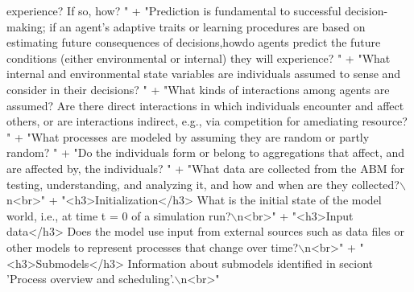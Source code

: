 \begin{DoxyCode}
{       experience? If so, how? "}
                                             +                            \textcolor{stringliteral}{"Prediction is fundamental to
       successful decision-making; if an agent's adaptive traits or learning procedures are based on estimating future
       consequences of decisions,howdo agents predict the future conditions (either environmental or internal)
       they will experience? "}
                                             +                            \textcolor{stringliteral}{"What internal and environmental
       state variables are individuals assumed to sense and consider in their decisions? "}
                                             +                            \textcolor{stringliteral}{"What kinds of interactions among
       agents are assumed? Are there direct interactions in which individuals encounter and affect others, or are
       interactions indirect, e.g., via competition for amediating resource? "}
                                             +                            \textcolor{stringliteral}{"What processes are modeled by
       assuming they are random or partly random? "}
                                             +                            \textcolor{stringliteral}{"Do the individuals form or
       belong to aggregations that affect, and are affected by, the individuals? "}
                                             +                            \textcolor{stringliteral}{"What data are collected from the
       ABM for testing, understanding, and analyzing it, and how and when are they collected?\(\backslash\)n<br>"}
                                             + \textcolor{stringliteral}{"<h3>Initialization</h3> What is the initial state of the
       model world, i.e., at time t = 0 of a simulation run?\(\backslash\)n<br>"}
                                             + \textcolor{stringliteral}{"<h3>Input data</h3> Does the model use input from external
       sources such as data files or other models to represent processes that change over time?\(\backslash\)n<br>"}
                                             + \textcolor{stringliteral}{"<h3>Submodels</h3> Information about submodels identified
       in seciont 'Process overview and scheduling'.\(\backslash\)n<br>"}
\end{DoxyCode}
